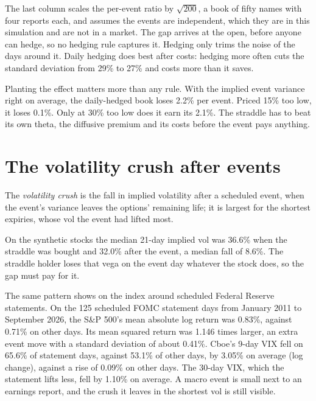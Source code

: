 The last column scales the per-event ratio by $\sqrt{200}$, a book of fifty names with four reports each, and assumes the events are independent,
which they are in this simulation and are not in a market. The gap arrives at the open, before anyone can hedge, so no hedging rule captures it. Hedging
only trims the noise of the days around it. Daily hedging does best after costs: hedging more often cuts the standard deviation from 29\% to 27\% and
costs more than it saves.

Planting the effect matters more than any rule. With the implied event variance right on average, the daily-hedged book loses 2.2\% per event. Priced
15\% too low, it loses 0.1\%. Only at 30\% too low does it earn its 2.1\%. The straddle has to beat its own theta, the diffusive premium and its costs
before the event pays anything.

\section{The volatility crush after events}

\begin{definition}\label{def:s2:gamma-scalping-and-event-volatility:crush}
The \emph{volatility crush} is the fall in implied volatility after a scheduled event, when the event's variance leaves the
options' remaining life; it is largest for the shortest expiries, whose vol the event had lifted most.
\end{definition}

On the synthetic stocks the median 21-day implied vol was 36.6\% when the straddle was bought and 32.0\% after the event, a median fall of 8.6\%. The
straddle holder loses that vega on the event day whatever the stock does, so the gap must pay for it.

The same pattern shows on the index around scheduled Federal Reserve statements. On the 125 scheduled FOMC statement days from January 2011 to
September 2026, the S\&P 500's mean absolute log return was 0.83\%, against 0.71\% on other days. Its mean squared return was 1.146 times larger,
an extra event move with a standard deviation of about 0.41\%. Cboe's 9-day VIX fell on 65.6\% of statement days, against 53.1\% of other days, by
3.05\% on average (log change), against a rise of 0.09\% on other days. The 30-day VIX, which the statement lifts less, fell by 1.10\% on average.
A macro event is small next to an earnings report, and the crush it leaves in the shortest vol is still visible.

